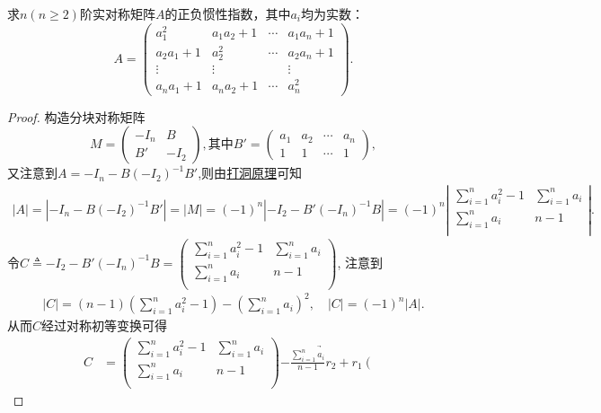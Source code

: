 \documentclass[../../main.tex]{subfiles}%
\begin{document}
\begin{proposition}
求\(n(n\geqslant 2)\)阶实对称矩阵\(A\)的正负惯性指数，其中\(a_i\)均为实数：
\[
A = \begin{pmatrix}
a_1^2 & a_1a_2 + 1 & \cdots & a_1a_n + 1 \\
a_2a_1 + 1 & a_2^2 & \cdots & a_2a_n + 1 \\
\vdots & \vdots & & \vdots \\
a_na_1 + 1 & a_na_2 + 1 & \cdots & a_n^2
\end{pmatrix}.
\]
\end{proposition} 
\begin{proof}

构造分块对称矩阵
\[
M = \begin{pmatrix}
-I_n & B \\
B' & -I_2
\end{pmatrix}, \text{其中} B' = \begin{pmatrix}
a_1 & a_2 & \cdots & a_n \\
1 & 1 & \cdots & 1
\end{pmatrix},
\]
又注意到$A=-I_n-B(-I_2)^{-1}B'$,则由\hyperref[proposition:打洞原理]{打洞原理}可知
\begin{align*}
\left| A \right|=\left| -I_n-B(-I_2)^{-1}B' \right|=\left| M \right|=\left( -1 \right) ^n\left| -I_2-B' (-I_n)^{-1}B \right|=\left( -1 \right) ^n\left| \begin{matrix}
\sum_{i=1}^n{a_{i}^{2}}-1&		\sum_{i=1}^n{a_i}\\
\sum_{i=1}^n{a_i}&		n-1\\
\end{matrix} \right|.
\end{align*}
令$C\triangleq -I_2-B' (-I_n)^{-1}B=\left( \begin{matrix}
\sum_{i=1}^n{a_{i}^{2}}-1&		\sum_{i=1}^n{a_i}\\
\sum_{i=1}^n{a_i}&		n-1\\
\end{matrix} \right) $,
注意到
\begin{align*}
|C|=\left( n-1 \right) \left( \sum_{i=1}^n{a_{i}^{2}}-1 \right) -\left( \sum_{i=1}^n{a_i} \right) ^2,\quad |C|=(-1)^n|A|.
\end{align*}
从而$C$经过对称初等变换可得
\begin{align*}
C&=\left( \begin{matrix}
\sum_{i=1}^n{a_{i}^{2}}-1&		\sum_{i=1}^n{a_i}\\
\sum_{i=1}^n{a_i}&		n-1\\
\end{matrix} \right) \underrightarrow{-\frac{\sum\limits_{i=1}^n{a_i}}{n-1}r_2+r_1}\left( \begin{matrix}

\end{matrix}
\end{align*}
\end{proof}
\end{document}
